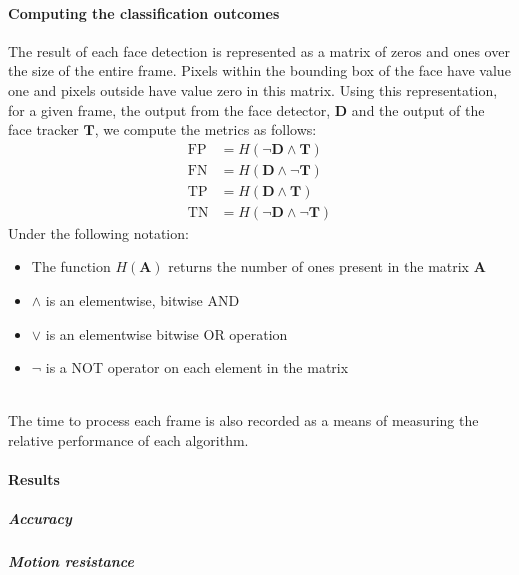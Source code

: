 \paragraph{Computing the classification outcomes} The result of each face detection is represented as a matrix of zeros and ones over the size of the entire frame.
Pixels within the bounding box of the face have value one and pixels outside have value zero in this matrix. Using this representation, for a given frame, the output from the face detector, $\mathbf{D}$ and the output of the face tracker $\mathbf{T}$, we compute the metrics as follows: 
\begin{align*}
    \mathrm{FP} &= H(\neg{\mathbf{D}} \wedge \mathbf{T}) \\
    \mathrm{FN} &= H(\mathbf{D} \wedge \neg{\mathbf{T}})\\
    \mathrm{TP} &= H(\mathbf{D} \wedge \mathbf{T})\\
    \mathrm{TN} &= H(\neg{\mathbf{D}} \wedge \neg{\mathbf{T}})
\end{align*}
Under the following notation: 
\begin{itemize}
    \item The function $H(\mathbf{A})$ returns the number of ones present in the matrix $\mathbf{A}$
    \item $\wedge$ is an elementwise, bitwise AND 
    \item $\vee$ is an elementwise bitwise OR operation 
    \item $\neg$ is a NOT operator on each element in the matrix
\\\\
\end{itemize}
The time to process each frame is also recorded as a means of measuring the relative performance of each algorithm.


\paragraph{Results}

\subparagraph{Accuracy}
\subparagraph{Motion resistance}

